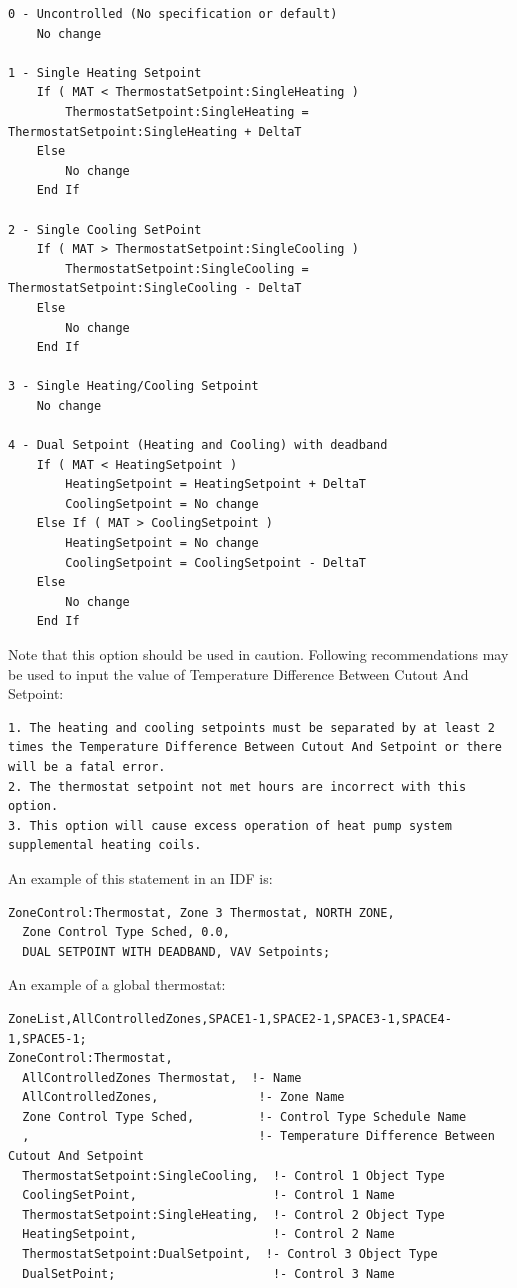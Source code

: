 \begin{lstlisting}
0 - Uncontrolled (No specification or default)
	No change

1 - Single Heating Setpoint
	If ( MAT < ThermostatSetpoint:SingleHeating )
		ThermostatSetpoint:SingleHeating = ThermostatSetpoint:SingleHeating + DeltaT
	Else
		No change
	End If

2 - Single Cooling SetPoint
	If ( MAT > ThermostatSetpoint:SingleCooling )
		ThermostatSetpoint:SingleCooling = ThermostatSetpoint:SingleCooling - DeltaT
	Else
		No change
	End If

3 - Single Heating/Cooling Setpoint
	No change

4 - Dual Setpoint (Heating and Cooling) with deadband
	If ( MAT < HeatingSetpoint )
		HeatingSetpoint = HeatingSetpoint + DeltaT
		CoolingSetpoint = No change
	Else If ( MAT > CoolingSetpoint )
		HeatingSetpoint = No change
		CoolingSetpoint = CoolingSetpoint - DeltaT
	Else
		No change
	End If
\end{lstlisting}

Note that this option should be used in caution. Following recommendations may be used to input the value of Temperature Difference Between Cutout And Setpoint:

\begin{lstlisting}
1. The heating and cooling setpoints must be separated by at least 2 times the Temperature Difference Between Cutout And Setpoint or there will be a fatal error.
2. The thermostat setpoint not met hours are incorrect with this option.
3. This option will cause excess operation of heat pump system supplemental heating coils.

\end{lstlisting}

An example of this statement in an IDF is:

\begin{lstlisting}
ZoneControl:Thermostat, Zone 3 Thermostat, NORTH ZONE,
  Zone Control Type Sched, 0.0,
  DUAL SETPOINT WITH DEADBAND, VAV Setpoints;
\end{lstlisting}

An example of a global thermostat:

\begin{lstlisting}
ZoneList,AllControlledZones,SPACE1-1,SPACE2-1,SPACE3-1,SPACE4-1,SPACE5-1;
ZoneControl:Thermostat,
  AllControlledZones Thermostat,  !- Name
  AllControlledZones,              !- Zone Name
  Zone Control Type Sched,         !- Control Type Schedule Name
  ,                                !- Temperature Difference Between Cutout And Setpoint
  ThermostatSetpoint:SingleCooling,  !- Control 1 Object Type
  CoolingSetPoint,                   !- Control 1 Name
  ThermostatSetpoint:SingleHeating,  !- Control 2 Object Type
  HeatingSetpoint,                   !- Control 2 Name
  ThermostatSetpoint:DualSetpoint,  !- Control 3 Object Type
  DualSetPoint;                      !- Control 3 Name
\end{lstlisting}

